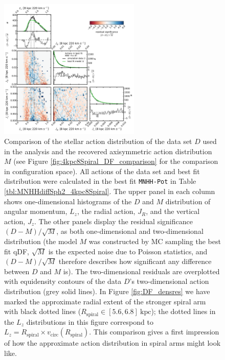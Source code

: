 \documentclass[iop,revtex4,numberedappendix,appendixfloats]{emulateapj}
\begin{document}
\begin{figure}[!htbp]
\centering
\includegraphics[width=0.6\textwidth]{fig/MNdHHdiffSph2_4kpc8Spiral_a_data_bestfit_residuals_only_actions.pdf}
\caption{Comparison of the stellar action distribution of the data set $D$ used in the analysis and the recovered axisymmetric action distribution $M$ (see Figure \ref{fig:4kpc8Spiral_DF_comparison} for the comparison in configuration space). All actions of the data set and best fit distribution were calculated in the best fit \texttt{MNHH-Pot} in Table \ref{tbl:MNHHdiffSph2_4kpc8Spiral}. The upper panel in each column shows one-dimensional histograms of the $D$ and $M$ distribution of angular momentum, $L_z$, the radial action, $J_R$, and the vertical action, $J_z$. The other panels display the residual significance $(D-M)/\sqrt{M}$, as both one-dimensional and two-dimensional distribution (the model $M$ was constructed by MC sampling the best fit qDF, $\sqrt{M}$ is the expected noise due to Poisson statistics, and $(D-M)/\sqrt{M}$ therefore describes how significant any difference between $D$ and $M$ is). The two-dimensional residuals are overplotted with equidensity contours of the data $D$'s two-dimensional action distribution (grey solid lines). In Figure \ref{fig:DF_densres} we have marked the approximate radial extent of the stronger spiral arm with black dotted lines ($R_\text{spiral} \in [5.6,6.8]~\text{kpc}$); the dotted lines in the $L_z$ distributions in this figure correspond to $L_z = R_\text{spiral} \times v_\text{circ}(R_\text{spiral})$. This comparison gives a first impression of how the approximate action distribution in spiral arms might look like.}
\label{fig:4kpc8Spiral_actions}
\end{figure}
\end{document}
